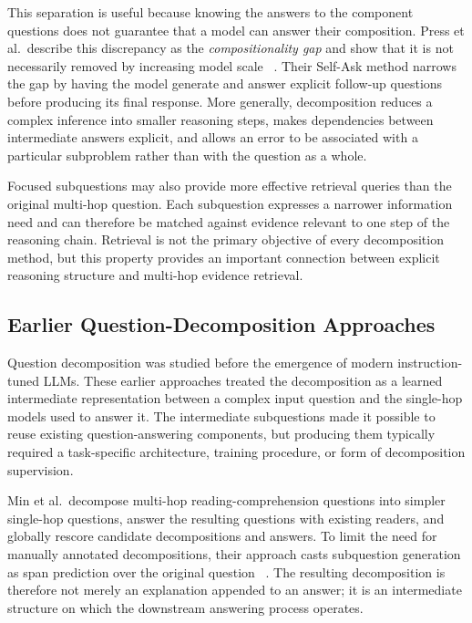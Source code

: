 This separation is useful because knowing the answers to the component
questions does not guarantee that a model can answer their composition. Press
et al.\ describe this discrepancy as the \emph{compositionality gap} and show
that it is not necessarily removed by increasing model scale
~\cite{press2023compositionality}. Their Self-Ask method narrows the gap by
having the model generate and answer explicit follow-up questions before
producing its final response. More generally, decomposition reduces a complex
inference into smaller reasoning steps, makes dependencies between intermediate
answers explicit, and allows an error to be associated with a particular
subproblem rather than with the question as a whole.

Focused subquestions may also provide more effective retrieval queries than the
original multi-hop question. Each subquestion expresses a narrower information
need and can therefore be matched against evidence relevant to one step of the
reasoning chain. Retrieval is not the primary objective of every decomposition
method, but this property provides an important connection between explicit
reasoning structure and multi-hop evidence retrieval.

\subsection{Earlier Question-Decomposition Approaches}
\label{subsec:earlier-decomposition}

Question decomposition was studied before the emergence of modern
instruction-tuned LLMs. These earlier approaches treated the decomposition as a
learned intermediate representation between a complex input question and the
single-hop models used to answer it. The intermediate subquestions made it
possible to reuse existing question-answering components, but producing them
typically required a task-specific architecture, training procedure, or form
of decomposition supervision.

Min et al.\ decompose multi-hop reading-comprehension questions into simpler
single-hop questions, answer the resulting questions with existing readers,
and globally rescore candidate decompositions and answers. To limit the need
for manually annotated decompositions, their approach casts subquestion
generation as span prediction over the original question
~\cite{min2019multihop}. The resulting decomposition is therefore not merely an
explanation appended to an answer; it is an intermediate structure on which the
downstream answering process operates.

